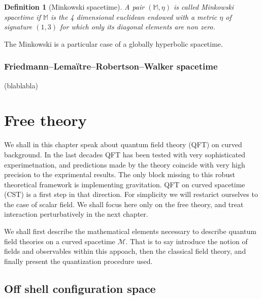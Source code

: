 \documentclass[10pt]{book}
\newcommand{\Mcal}{\mathcal{M}}
\newcommand{\Mbb}{\mathbb{M}}
\theoremstyle{break}
\newtheorem{definition}{Definition}
\begin{document}
\begin{definition}[Minkowski spacetime]
A pair $(\Mbb,\eta)$ is called Minkowski spacetime if $\Mbb$ is the 4 dimensional euclidean endowed with a metric $\eta$ of signature $(1,3)$ for which only its diagonal elements are non zero.
\end{definition}


The Minkowski is a particular case of a globally hyperbolic spacetime.


\subsection{Friedmann--Lemaïtre--Robertson--Walker spacetime}


(blablabla)


\chapter{Free theory}


We shall in this chapter speak about quantum field theory (QFT) on curved background. In the last decades QFT has been tested with very sophisticated experimetnation, and predictions made by the theory coincide with very high precision to the exprimental results. The only block missing to this robust theoretical framework is implementing gravitation. QFT on curved spacetime (CST) is a first step in that direction. For simplicity we will restarict ourselves to the case of scalar field. We shall focus here only on the free theory, and treat interaction perturbatively in the next chapter.\par%


\bigskip


We shall first describe the mathematical elements necessary to describe quantum field theories on a curved spacetime $\Mcal$. That is to say introduce the notion of fields and observables within this appoach, then the classical field theory, and finally present the quantization procedure used.


\section{Off shell configuration space}
\end{document}
